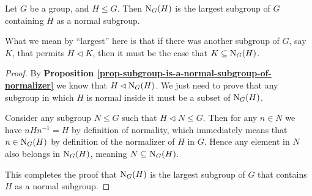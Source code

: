 \begin{proposition}\label{prop-normalizer-of-subgroup-is-largest-subgroup-containing-that-subgroup-as-a-normal-subgroup}
    Let $G$ be a group, and $H \leq G$. Then $\mathrm{N}_{G}(H)$ is the largest subgroup of $G$ containing $H$ as a normal subgroup.
\end{proposition}
\begin{remark}
    What we mean by ``largest'' here is that if there was another subgroup of $G$, say $K$, that permits $H \lhd K$, then it must be the case that $K \subseteq \mathrm{N}_{G}(H)$.
\end{remark}
\begin{proof}
    By \textbf{Proposition \ref{prop-subgroup-is-a-normal-subgroup-of-normalizer}} we know that $H \lhd \mathrm{N}_{G}(H)$. We just need to prove that any subgroup in which $H$ is normal inside it must be a subset of $\mathrm{N}_{G}(H)$.

    Consider any subgroup $N \leq G$ such that $H \lhd N \leq G$. Then for any $n \in N$ we have $nHn^{-1} = H$ by definition of normality, which immediately means that $n \in \mathrm{N}_{G}(H)$ by definition of the normalizer of $H$ in $G$. Hence any element in $N$ also belongs in $\mathrm{N}_{G}(H)$, meaning $N \subseteq \mathrm{N}_{G}(H)$.

    This completes the proof that $\mathrm{N}_{G}(H)$ is the largest subgroup of $G$ that contains $H$ as a normal subgroup.
\end{proof}

